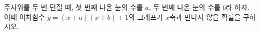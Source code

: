주사위를 두 번 던질 때, 첫 번째 나온 눈의 수를 $a$, 두 번째 나온 눈의 수를 $b$라 하자. 이때 이차함수 $y=(x+a)(x+b)+1$의 그래프가 $x$축과 만나지 않을 확률을 구하시오.
